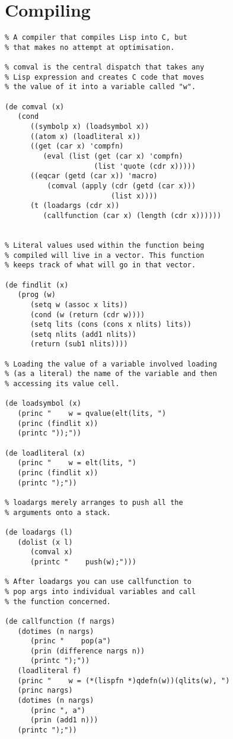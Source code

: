 \section{Compiling}
{\small\begin{verbatim}
% A compiler that compiles Lisp into C, but
% that makes no attempt at optimisation.

% comval is the central dispatch that takes any
% Lisp expression and creates C code that moves
% the value of it into a variable called "w".

(de comval (x)
   (cond
      ((symbolp x) (loadsymbol x))
      ((atom x) (loadliteral x))
      ((get (car x) 'compfn)
         (eval (list (get (car x) 'compfn)
                     (list 'quote (cdr x)))))
      ((eqcar (getd (car x)) 'macro)
          (comval (apply (cdr (getd (car x)))
                         (list x))))
      (t (loadargs (cdr x))
         (callfunction (car x) (length (cdr x))))))


% Literal values used within the function being
% compiled will live in a vector. This function
% keeps track of what will go in that vector.

(de findlit (x)
   (prog (w)
      (setq w (assoc x lits))
      (cond (w (return (cdr w))))
      (setq lits (cons (cons x nlits) lits))
      (setq nlits (add1 nlits))
      (return (sub1 nlits))))

% Loading the value of a variable involved loading
% (as a literal) the name of the variable and then
% accessing its value cell.

(de loadsymbol (x)
   (princ "    w = qvalue(elt(lits, ")
   (princ (findlit x))
   (printc "));"))

(de loadliteral (x)
   (princ "    w = elt(lits, ")
   (princ (findlit x))
   (printc ");"))

% loadargs merely arranges to push all the
% arguments onto a stack.

(de loadargs (l)
   (dolist (x l)
      (comval x)
      (printc "    push(w);")))

% After loadargs you can use callfunction to
% pop args into individual variables and call
% the function concerned.

(de callfunction (f nargs)
   (dotimes (n nargs)
      (princ "    pop(a")
      (prin (difference nargs n))
      (printc ");"))
   (loadliteral f)
   (princ "    w = (*(lispfn *)qdefn(w))(qlits(w), ")
   (princ nargs)
   (dotimes (n nargs)
      (princ ", a")
      (prin (add1 n)))
   (printc ");"))
      

\end{verbatim}}
